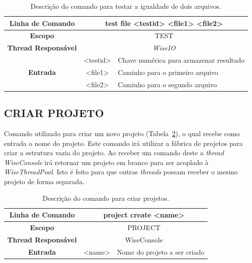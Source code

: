 \begin{center}
	\begin{table}[!htbp]
		\begin{tabularx}{\textwidth}{c|c|X}
			\toprule
			\textbf{Linha de Comando} & \multicolumn{2}{c}{test file <test\underline{\space\space}id> <file1> <file2>} \\
			\midrule
			\textbf{Escopo} & \multicolumn{2}{c}{TEST} \\
			\hline
			\textbf{Thread Responsável} & \multicolumn{2}{c}{\textit{WiseIO}} \\
			\hline
			\multirow{3}{*}{\textbf{Entrada}} & <test\underline{\space\space}id> & Chave numérica para armazenar resultado \\
			& <file1> & Caminho para o primeiro arquivo \\
			& <file2> & Caminho para o segundo arquivo \\
			\bottomrule
		\end{tabularx}
		\caption{Descrição do comando para testar a igualdade de dois arquivos.}
		\label{tab:file_test}
	\end{table}
\end{center}

\subsection{CRIAR PROJETO}\label{sec:create_projects}

Comando utilizado para criar um novo projeto (Tabela~\ref{tab:create_project}), o qual recebe como entrada o nome do projeto. Este comando irá utilizar a fábrica de projetos para criar a estrutura vazia do projeto. Ao receber um comando deste a \textit{thread} \textit{WiseConsole} irá retornar um projeto em branco para ser acoplado à \textit{WiseThreadPool}. Isto é feito para que outras \textit{threads} possam receber o mesmo projeto de forma separada.

\begin{center}
	\begin{table}[!htbp]
		\begin{tabularx}{\textwidth}{c|c|X}
			\toprule
			\textbf{Linha de Comando} & \multicolumn{2}{c}{project create <name>} \\
			\midrule
			\textbf{Escopo} & \multicolumn{2}{c}{PROJECT} \\
			\hline
			\textbf{Thread Responsável} & \multicolumn{2}{c}{WiseConsole} \\
			\hline
			\textbf{Entrada} & <name> & Nome do projeto a ser criado \\
			\bottomrule
		\end{tabularx}
		\caption{Descrição do comando para criar projetos.}
		\label{tab:create_project}
	\end{table}
\end{center}

